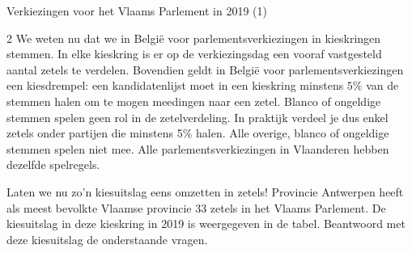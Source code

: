 \begin{lesactiviteit}{Verkiezingen voor het Vlaams Parlement in 2019 (1)}
\begin{multicols}{2}
 We weten nu dat we in België voor parlementsverkiezingen in kieskringen stemmen. In elke kieskring is er op de verkiezingsdag een vooraf vastgesteld aantal zetels te verdelen. Bovendien geldt in België voor parlementsverkiezingen een kiesdrempel: een kandidatenlijst moet in een kieskring minstens $5\%$ van de stemmen halen om te mogen meedingen naar een zetel. Blanco of ongeldige stemmen spelen geen rol in de zetelverdeling. In praktijk verdeel je dus enkel zetels onder partijen die minstens 5\% halen. Alle overige, blanco of ongeldige stemmen spelen niet mee. Alle parlementsverkiezingen in Vlaanderen hebben dezelfde spelregels.
 
 Laten we nu zo'n kiesuitslag eens omzetten in zetels! Provincie Antwerpen heeft als meest bevolkte Vlaamse provincie 33 zetels in het Vlaams Parlement. De kiesuitslag in deze kieskring in 2019 is weergegeven in de tabel. Beantwoord met deze kiesuitslag de onderstaande vragen. 
 

\end{multicols}
\end{lesactiviteit}
